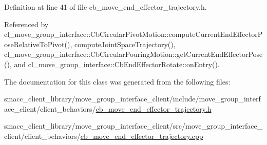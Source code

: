 Definition at line 41 of file cb\+\_\+move\+\_\+end\+\_\+effector\+\_\+trajectory.\+h.



Referenced by cl\+\_\+move\+\_\+group\+\_\+interface\+::\+Cb\+Circular\+Pivot\+Motion\+::compute\+Current\+End\+Effector\+Pose\+Relative\+To\+Pivot(), compute\+Joint\+Space\+Trajectory(), cl\+\_\+move\+\_\+group\+\_\+interface\+::\+Cb\+Circular\+Pouring\+Motion\+::get\+Current\+End\+Effector\+Pose(), and cl\+\_\+move\+\_\+group\+\_\+interface\+::\+Cb\+End\+Effector\+Rotate\+::on\+Entry().



The documentation for this class was generated from the following files\+:\begin{DoxyCompactItemize}
\item 
smacc\+\_\+client\+\_\+library/move\+\_\+group\+\_\+interface\+\_\+client/include/move\+\_\+group\+\_\+interface\+\_\+client/client\+\_\+behaviors/\hyperlink{cb__move__end__effector__trajectory_8h}{cb\+\_\+move\+\_\+end\+\_\+effector\+\_\+trajectory.\+h}\item 
smacc\+\_\+client\+\_\+library/move\+\_\+group\+\_\+interface\+\_\+client/src/move\+\_\+group\+\_\+interface\+\_\+client/client\+\_\+behaviors/\hyperlink{cb__move__end__effector__trajectory_8cpp}{cb\+\_\+move\+\_\+end\+\_\+effector\+\_\+trajectory.\+cpp}\end{DoxyCompactItemize}
